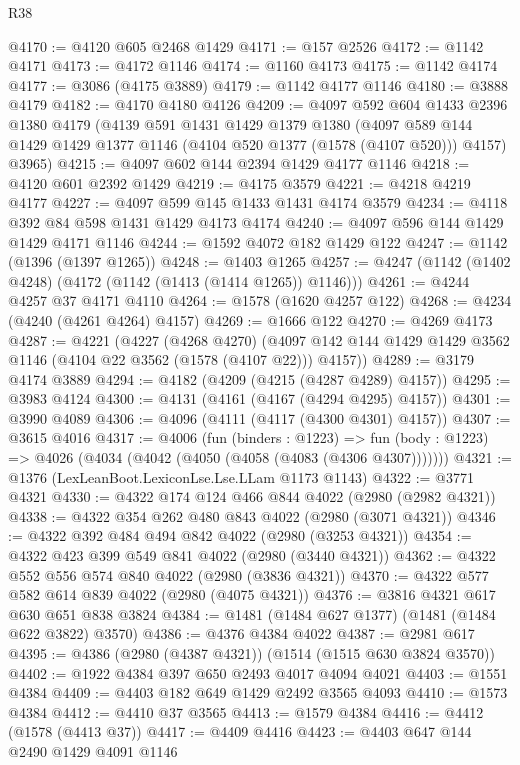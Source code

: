 \begin{lexlean}{R38}
\begin{coremodule}
@4170 := @4120 @605 @2468 @1429
@4171 := @157 @2526
@4172 := @1142 @4171
@4173 := @4172 @1146
@4174 := @1160 @4173
@4175 := @1142 @4174
@4177 := @3086 (@4175 @3889)
@4179 := @1142 @4177 @1146
@4180 := @3888 @4179
@4182 := @4170 @4180 @4126
@4209 := @4097
    @592
    @604
    @1433
    @2396
    @1380
    @4179
    (@4139
      @591
      @1431
      @1429
      @1379
      @1380
      (@4097 @589 @144 @1429 @1429 @1377 @1146 (@4104 @520 @1377 (@1578 (@4107 @520))) @4157)
      @3965)
@4215 := @4097 @602 @144 @2394 @1429 @4177 @1146
@4218 := @4120 @601 @2392 @1429
@4219 := @4175 @3579
@4221 := @4218 @4219 @4177
@4227 := @4097 @599 @145 @1433 @1431 @4174 @3579
@4234 := @4118 @392 @84 @598 @1431 @1429 @4173 @4174
@4240 := @4097 @596 @144 @1429 @1429 @4171 @1146
@4244 := @1592 @4072 @182 @1429 @122
@4247 := @1142 (@1396 (@1397 @1265))
@4248 := @1403 @1265
@4257 := @4247 (@1142 (@1402 @4248) (@4172 (@1142 (@1413 (@1414 @1265)) @1146)))
@4261 := @4244 @4257 @37 @4171 @4110
@4264 := @1578 (@1620 @4257 @122)
@4268 := @4234 (@4240 (@4261 @4264) @4157)
@4269 := @1666 @122
@4270 := @4269 @4173
@4287 := @4221
    (@4227
      (@4268 @4270)
      (@4097 @142 @144 @1429 @1429 @3562 @1146 (@4104 @22 @3562 (@1578 (@4107 @22))) @4157))
@4289 := @3179 @4174 @3889
@4294 := @4182 (@4209 (@4215 (@4287 @4289) @4157))
@4295 := @3983 @4124
@4300 := @4131 (@4161 (@4167 (@4294 @4295) @4157))
@4301 := @3990 @4089
@4306 := @4096 (@4111 (@4117 (@4300 @4301) @4157))
@4307 := @3615 @4016
@4317 := @4006
    (fun (binders : @1223) =>
    fun (body : @1223) => @4026 (@4034 (@4042 (@4050 (@4058 (@4083 (@4306 @4307)))))))
@4321 := @1376 (LexLeanBoot.LexiconLse.Lse.LLam @1173 @1143)
@4322 := @3771 @4321
@4330 := @4322 @174 @124 @466 @844 @4022 (@2980 (@2982 @4321))
@4338 := @4322 @354 @262 @480 @843 @4022 (@2980 (@3071 @4321))
@4346 := @4322 @392 @484 @494 @842 @4022 (@2980 (@3253 @4321))
@4354 := @4322 @423 @399 @549 @841 @4022 (@2980 (@3440 @4321))
@4362 := @4322 @552 @556 @574 @840 @4022 (@2980 (@3836 @4321))
@4370 := @4322 @577 @582 @614 @839 @4022 (@2980 (@4075 @4321))
@4376 := @3816 @4321 @617 @630 @651 @838 @3824
@4384 := @1481 (@1484 @627 @1377) (@1481 (@1484 @622 @3822) @3570)
@4386 := @4376 @4384 @4022
@4387 := @2981 @617
@4395 := @4386 (@2980 (@4387 @4321)) (@1514 (@1515 @630 @3824 @3570))
@4402 := @1922 @4384 @397 @650 @2493 @4017 @4094 @4021
@4403 := @1551 @4384
@4409 := @4403 @182 @649 @1429 @2492 @3565 @4093
@4410 := @1573 @4384
@4412 := @4410 @37 @3565
@4413 := @1579 @4384
@4416 := @4412 (@1578 (@4413 @37))
@4417 := @4409 @4416
@4423 := @4403 @647 @144 @2490 @1429 @4091 @1146

\end{coremodule}
\end{lexlean}
